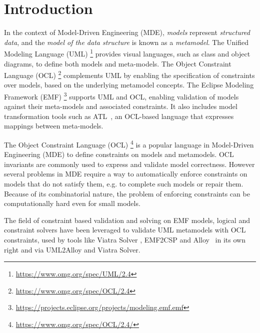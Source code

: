 \chapter*{Introduction}

In the context of Model-Driven Engineering (MDE), \emph{models} represent \emph{structured data}, and the \emph{model of the data structure} is known as a \emph{metamodel}. The Unified Modeling Language (UML)
\footnote{\url{https://www.omg.org/spec/UML/2.4}}
provides visual languages, such as class and object diagrams, to define both models and meta-models. The Object Constraint Language (OCL)
\footnote{\url{https://www.omg.org/spec/OCL/2.4}}
complements UML by enabling the specification of constraints over models, based on the underlying metamodel concepts. The Eclipse Modeling Framework (EMF)
\footnote{\url{https://projects.eclipse.org/projects/modeling.emf.emf}}
supports UML and OCL, enabling validation of models against their meta-models and associated constraints. It also includes model transformation tools such as ATL~\cite{jouault2008atl,Le_Calvar2019-atol}, an OCL-based language that expresses mappings between meta-models.

The Object Constraint Language 
(OCL)
\footnote{\url{https://www.omg.org/spec/OCL/2.4/}} is a popular language in Model-Driven Engineering (MDE) to define constraints on models and metamodels. OCL invariants are commonly used to express and validate model correctness. 
However several problems in MDE require a way to automatically enforce constraints on models that do not satisfy them, e.g. to complete such models or repair them.
Because of its combinatorial nature, the problem of enforcing constraints can be computationally hard even for small models. 

The field of constraint based validation and solving on EMF models, logical and constraint solvers have been leveraged to validate UML metamodels with OCL constraints, used by tools like Viatra Solver \cite{ViatraSolver}, EMF2CSP \cite{Gonzalez2012-emf2csp} and Alloy~\cite{Jackson2002-alloy} in its own right and via UML2Alloy\cite{uml2alloy} and Viatra Solver.

